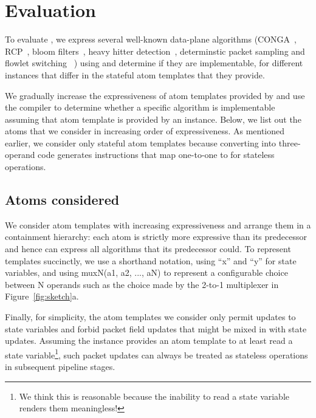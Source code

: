 \section{Evaluation}
\label{s:eval}

To evaluate \pktlanguage, we express several well-known data-plane algorithms
(CONGA~\cite{conga}, RCP~\cite{rcp}, bloom filters~\cite{bloom}, heavy hitter
detection~\cite{opensketch}, determinstic packet sampling and flowlet switching
~\cite{flowlets}) using \pktlanguage and determine if they are implementable,
for different \absmachine instances that differ in the stateful atom templates
that they provide.

We gradually increase the expressiveness of atom templates provided by
\pktlanguage and use the \pktlanguage compiler to determine whether a specific
algorithm is implementable assuming that atom template is provided by an
\absmachine instance. Below, we list out the atoms that we consider in
increasing order of expressiveness. As mentioned earlier, we consider only
stateful atom templates because converting into three-operand code generates
instructions that map one-to-one to \absmachine for stateless operations.

\subsection{Atoms considered}

We consider atom templates with increasing expressiveness and arrange them in a
containment hierarchy: each atom is strictly more expressive than its
predecessor and hence can express all algorithms that its predecessor could. To
represent templates succinctly, we use a shorthand notation, using ``x'' and
``y'' for state variables, and using muxN(a1, a2, ..., aN) to represent a
configurable choice between N operands such as the choice made by the 2-to-1
multiplexer in Figure~\ref{fig:sketch}a.

Finally, for simplicity, the atom templates we consider only permit updates to
state variables and forbid packet field updates that might be mixed in with
state updates. Assuming the \absmachine instance provides an atom template to
at least read a state variable\footnote{We think this is reasonable because the
inability to read a state variable renders them meaningless!}, such packet
updates can always be treated as stateless operations in subsequent pipeline
stages.

